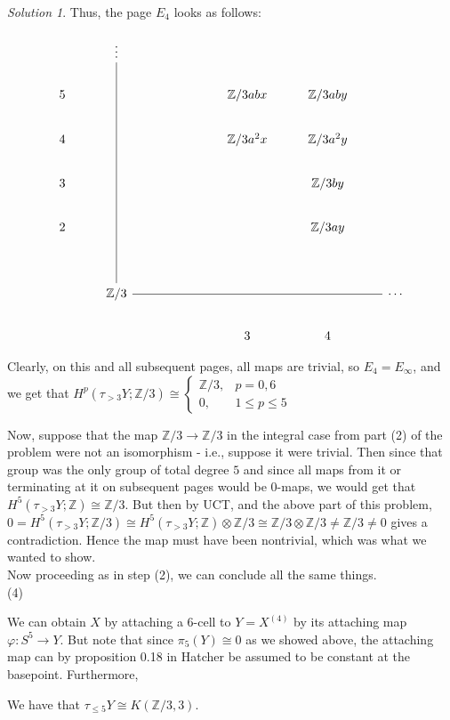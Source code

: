 \documentclass[reqno]{amsart}
\theoremstyle{definition}
\theoremstyle{remark}
\newtheorem*{solution}{Solution}
\begin{document}
\begin{solution}
Thus, the page $E_4$ looks as follows:

\[\begin{tikzcd}
	& \vdots \\
	5 &&&& {\mathbb{Z}/3abx} & {\mathbb{Z}/3aby} \\
	4 &&&& {\mathbb{Z}/3a^2x} & {\mathbb{Z}/3a^2y} \\
	3 &&&&& {\mathbb{Z}/3by} \\
	2 &&&&& {\mathbb{Z}/3ay} \\
	\\
	& {\mathbb{Z}/3} &&&&& \cdots \\
	&&&& 3 & 4
	\arrow[no head, from=7-2, to=1-2]
	\arrow[no head, from=7-2, to=7-7]
\end{tikzcd}\]

Clearly, on this and all subsequent pages, all
maps are trivial, so
$E_4 = E_{\infty}$, and we get that
$H^{p}\left( \tau_{>3}Y; \mathbb{Z}/3 \right) 
\cong
\begin{cases}
    \mathbb{Z}/3,& p=0,6\\
    0,& 1\le p\le 5
\end{cases}$


Now, suppose that the map
$\mathbb{Z}/3 \to \mathbb{Z}/3$ in the
integral case from part (2) of the problem were
not an isomorphism - i.e., suppose it were trivial.
Then since that group was the only group of total degree
$5$ and since all maps from it or terminating at it on subsequent
pages would be $0$-maps, we would get that
$H^{5}(\tau_{>3}Y;\mathbb{Z}) \cong \mathbb{Z}/3$.
But then by UCT, and the above part of this problem,
$0 = H^{5}\left( \tau_{>3}Y;\mathbb{Z}/3 \right) 
\cong H^{5}\left( \tau_{>3}Y ; \mathbb{Z} \right) \otimes
\mathbb{Z}/3 \cong \mathbb{Z}/3 \otimes \mathbb{Z}/3 
\neq \mathbb{Z}/3 \neq 0$
gives a contradiction. Hence the map
must have been nontrivial, which was what we wanted to show.\\
\linebreak
Now proceeding as in step (2), we can conclude all the same things.\\
\linebreak
(4) 

We can obtain $X$ by attaching a $6$-cell
to $Y = X^{(4)}$ by its attaching map
$\varphi \colon S^{5} \to Y $.
But note that since
$ \pi_5(Y) \cong 0$ as we showed above,
the attaching map can by
proposition 0.18 in Hatcher be assumed to be constant at
the basepoint. Furthermore,

We have that
$\tau_{\le 5} Y \cong
K\left( \mathbb{Z}/3, 3 \right) $.


\end{solution}
\end{document}
